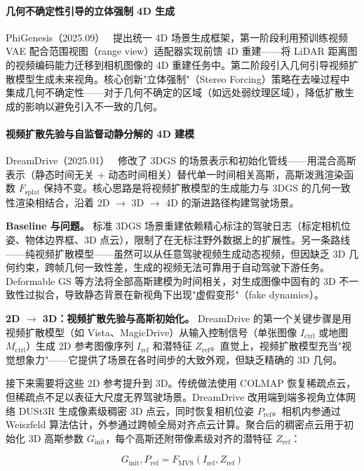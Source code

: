 \paragraph{几何不确定性引导的立体强制 4D 生成}

PhiGenesis（2025.09）~\cite{2509_20251} 提出统一 4D 场景生成框架，第一阶段利用预训练视频 VAE 配合范围视图（range view）适配器实现前馈 4D 重建——将 LiDAR 距离图的视频编码能力迁移到相机图像的 4D 重建任务中。第二阶段引入几何引导视频扩散模型生成未来视角。核心创新"立体强制"（Stereo Forcing）策略在去噪过程中集成几何不确定性——对于几何不确定的区域（如远处弱纹理区域），降低扩散生成的影响以避免引入不一致的几何。

\paragraph{视频扩散先验与自监督动静分解的 4D 建模}

DreamDrive（2025.01）~\cite{2501_00601} 修改了 3DGS 的场景表示和初始化管线——用混合高斯表示（静态时间无关 + 动态时间相关）替代单一时间相关高斯，高斯泼溅渲染函数 $F_\mathrm{splat}$ 保持不变。核心思路是将视频扩散模型的生成能力与 3DGS 的几何一致性渲染相结合，沿着 2D $\to$ 3D $\to$ 4D 的渐进路径构建驾驶场景。

\textbf{Baseline 与问题。} 标准 3DGS 场景重建依赖精心标注的驾驶日志（标定相机位姿、物体边界框、3D 点云），限制了在无标注野外数据上的扩展性。另一条路线——纯视频扩散模型——虽然可以从任意驾驶视频生成动态视频，但因缺乏 3D 几何约束，跨帧几何一致性差，生成的视频无法可靠用于自动驾驶下游任务。Deformable GS 等方法将全部高斯建模为时间相关，对生成图像中固有的 3D 不一致性过拟合，导致静态背景在新视角下出现"虚假变形"（fake dynamics）。

\textbf{2D $\to$ 3D：视频扩散先验与高斯初始化。} DreamDrive 的第一个关键步骤是用视频扩散模型（如 Vista、MagicDrive）从输入控制信号（单张图像 $I_\mathrm{ctrl}$ 或地图 $M_\mathrm{ctrl}$）生成 2D 参考图像序列 $I_\mathrm{ref}$ 和潜特征 $Z_\mathrm{ref}$。直觉上，视频扩散模型充当"视觉想象力"——它提供了场景在各时间步的大致外观，但缺乏精确的 3D 几何。

接下来需要将这些 2D 参考提升到 3D。传统做法使用 COLMAP 恢复稀疏点云，但稀疏点不足以表征大尺度无界驾驶场景。DreamDrive 改用端到端多视角立体网络 DUSt3R 生成像素级稠密 3D 点云，同时恢复相机位姿 $P_\mathrm{ref}$。相机内参通过 Weiszfeld 算法估计，外参通过跨帧全局对齐点云计算。聚合后的稠密点云用于初始化 3D 高斯参数 $G_\mathrm{init}$，每个高斯还附带像素级对齐的潜特征 $Z_\mathrm{ref}$：

\begin{equation}
G_\mathrm{init}, P_\mathrm{ref} = F_\mathrm{MVS}(I_\mathrm{ref}, Z_\mathrm{ref})
\end{equation}

